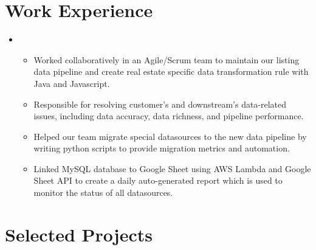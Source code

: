 \documentclass[12pt,a4paper,sans]{moderncv}        %
\begin{document}
\vspace{8pt}

\section{Work Experience}

\begin{itemize}
\vspace{6pt}

\item{

\begin{itemize}
\item{Worked collaboratively in an Agile/Scrum team to maintain our listing data pipeline and create real estate specific data transformation rule with Java and Javascript.}
\vspace{3pt}
\item{Responsible for resolving customer's and downstream's data-related issues, including data accuracy, data richness, and pipeline performance.
}
\vspace{3pt}
\item{Helped our team migrate special datasources to the new data pipeline by writing python scripts to provide migration metrics and automation.}
\vspace{3pt}
\item{Linked MySQL database to Google Sheet using AWS Lambda and Google Sheet API to create a daily auto-generated report which is used to monitor the status of all datasources.}

\end{itemize}}
\end{itemize}


\vspace{8pt}

\section{Selected Projects}

\vspace{6pt}
\end{document}
